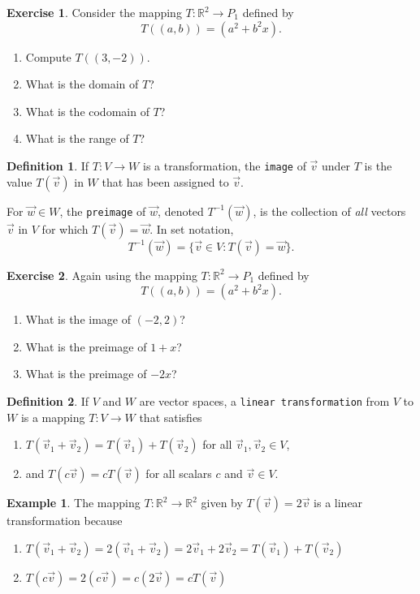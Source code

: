 \documentclass{beamer}
\newcommand{\R}{\mathbb{R}}
\newcommand{\fn}{\insertframenumber}
\theoremstyle{definition}
\newtheorem{exercise}{Exercise}
\newtheorem*{defn}{Definition}
\newtheorem*{exa}{Example}
\renewcommand{\emph}[1]{{\color{blue}\texttt{#1}}}
\begin{document}
\begin{frame}{\fn}
	\begin{exercise}
		Consider the mapping $T:\R^2\to P_1$ defined by $$T((a,b))=(a^2+b^2x).$$
			\begin{enumerate}[label=(\alph*)]
				\item Compute $T((3,-2))$.
				\item What is the domain of $T$?
				\item What is the codomain of $T$?
				\item What is the range of $T$?
			\end{enumerate}
	\end{exercise}
\end{frame}
\begin{frame}{\fn}
	\begin{defn}
		If $T:V\to W$ is a transformation, the \emph{image} of $\vec v$ under $T$ is the value $T(\vec v)$ in $W$ that has been assigned to $\vec v$.
		
		For $\vec w\in W$, the \emph{preimage} of $\vec w$, denoted $T^{-1}(\vec w)$, is the collection of \textit{all} vectors $\vec v$ in $V$ for which $T(\vec v)=\vec w$.  
		In set notation, \[T^{-1}(\vec w)=\{\vec v\in V : T(\vec v)=\vec w\}.\]
	\end{defn}
	\begin{exercise}
	Again using the mapping $T:\R^2\to P_1$ defined by $$T((a,b))=(a^2+b^2x).$$
		\begin{enumerate}[label=(\alph*)]
			\item What is the image of $(-2,2)$?
			\item What is the preimage of $1+x$?
			\item What is the preimage of $-2x$?
		\end{enumerate}
	\end{exercise}
\end{frame}
\begin{frame}{\fn}
	\begin{defn}
		If $V$ and $W$ are vector spaces, a \emph{linear transformation} from $V$ to $W$ is a mapping $T\colon V\to W$ that satisfies
			\begin{enumerate}[label=(\alph*)]
				\item $T(\vec v_1+\vec v_2)=T(\vec v_1)+T(\vec v_2)$ for all $\vec v_1,\vec v_2\in V$,
				\item and $T(c\vec v)=cT(\vec v)$ for all scalars $c$ and $\vec v\in V$.
			\end{enumerate}
	\end{defn}
	\begin{exa}
		The mapping $T:\R^2\to\R^2$ given by $T(\vec v)=2\vec v$ is a linear transformation because
		\begin{enumerate}[label=(\alph*)]
			\item $T(\vec v_1+\vec v_2)=2(\vec v_1+\vec v_2)=2\vec v_1+2\vec v_2=T(\vec v_1)+T(\vec v_2)$
			\item $T(c\vec v)=2(c\vec v)=c(2\vec v)=cT(\vec v)$
		\end{enumerate}
	\end{exa}
\end{frame}
\end{document}
